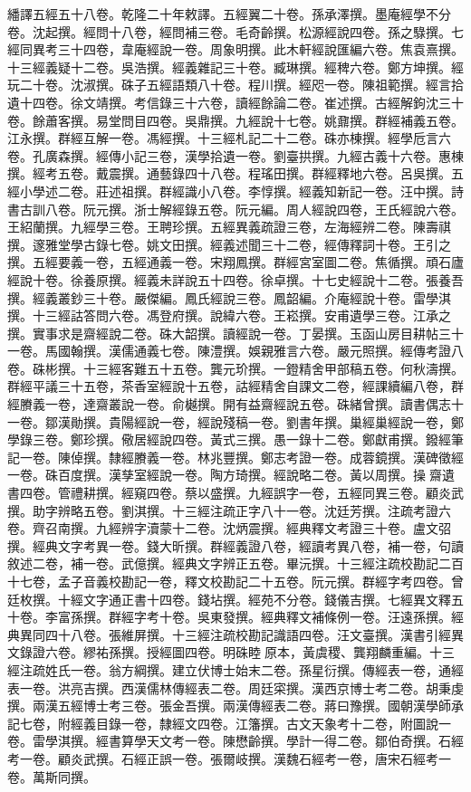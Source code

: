 \begin{pinyinscope}
繙譯五經五十八卷。乾隆二十年敕譯。五經翼二十卷。孫承澤撰。墨庵經學不分卷。沈起撰。經問十八卷，經問補三卷。毛奇齡撰。松源經說四卷。孫之騄撰。七經同異考三十四卷，韋庵經說一卷。周象明撰。此木軒經說匯編六卷。焦袁熹撰。十三經義疑十二卷。吳浩撰。經義雜記三十卷。臧琳撰。經稗六卷。鄭方坤撰。經玩二十卷。沈淑撰。硃子五經語類八十卷。程川撰。經咫一卷。陳祖範撰。經言拾遺十四卷。徐文靖撰。考信錄三十六卷，讀經餘論二卷。崔述撰。古經解鉤沈三十卷。餘蕭客撰。易堂問目四卷。吳鼎撰。九經說十七卷。姚鼐撰。群經補義五卷。江永撰。群經互解一卷。馮經撰。十三經札記二十二卷。硃亦棟撰。經學卮言六卷。孔廣森撰。經傳小記三卷，漢學拾遺一卷。劉臺拱撰。九經古義十六卷。惠棟撰。經考五卷。戴震撰。通藝錄四十八卷。程瑤田撰。群經釋地六卷。呂吳撰。五經小學述二卷。莊述祖撰。群經識小八卷。李惇撰。經義知新記一卷。汪中撰。詩書古訓八卷。阮元撰。浙士解經錄五卷。阮元編。周人經說四卷，王氏經說六卷。王紹蘭撰。九經學三卷。王聘珍撰。五經異義疏證三卷，左海經辨二卷。陳壽祺撰。邃雅堂學古錄七卷。姚文田撰。經義述聞三十二卷，經傳釋詞十卷。王引之撰。五經要義一卷，五經通義一卷。宋翔鳳撰。群經宮室圖二卷。焦循撰。頑石廬經說十卷。徐養原撰。經義未詳說五十四卷。徐卓撰。十七史經說十二卷。張養吾撰。經義叢鈔三十卷。嚴傑編。鳳氏經說三卷。鳳韶編。介庵經說十卷。雷學淇撰。十三經詁答問六卷。馮登府撰。說緯六卷。王崧撰。安甫遺學三卷。江承之撰。實事求是齋經說二卷。硃大韶撰。讀經說一卷。丁晏撰。玉函山房目耕帖三十一卷。馬國翰撰。漢儒通義七卷。陳澧撰。娛親雅言六卷。嚴元照撰。經傳考證八卷。硃彬撰。十三經客難五十五卷。龔元玠撰。一鐙精舍甲部稿五卷。何秋濤撰。群經平議三十五卷，茶香室經說十五卷，詁經精舍自課文二卷，經課續編八卷，群經賸義一卷，達齋叢說一卷。俞樾撰。開有益齋經說五卷。硃緒曾撰。讀書偶志十一卷。鄒漢勛撰。貴陽經說一卷，經說殘稿一卷。劉書年撰。巢經巢經說一卷，鄭學錄三卷。鄭珍撰。儆居經說四卷。黃式三撰。愚一錄十二卷。鄭獻甫撰。鏺經筆記一卷。陳倬撰。隸經賸義一卷。林兆豐撰。鄭志考證一卷。成蓉鏡撰。漢碑徵經一卷。硃百度撰。漢孳室經說一卷。陶方琦撰。經說略二卷。黃以周撰。操齋遺書四卷。管禮耕撰。經窺四卷。蔡以盛撰。九經誤字一卷，五經同異三卷。顧炎武撰。助字辨略五卷。劉淇撰。十三經注疏正字八十一卷。沈廷芳撰。注疏考證六卷。齊召南撰。九經辨字瀆蒙十二卷。沈炳震撰。經典釋文考證三十卷。盧文弨撰。經典文字考異一卷。錢大昕撰。群經義證八卷，經讀考異八卷，補一卷，句讀敘述二卷，補一卷。武億撰。經典文字辨正五卷。畢沅撰。十三經注疏校勘記二百十七卷，孟子音義校勘記一卷，釋文校勘記二十五卷。阮元撰。群經字考四卷。曾廷枚撰。十經文字通正書十四卷。錢坫撰。經苑不分卷。錢儀吉撰。七經異文釋五十卷。李富孫撰。群經字考十卷。吳東發撰。經典釋文補條例一卷。汪遠孫撰。經典異同四十八卷。張維屏撰。十三經注疏校勘記識語四卷。汪文臺撰。漢書引經異文錄證六卷。繆祐孫撰。授經圖四卷。明硃睦原本，黃虞稷、龔翔麟重編。十三經注疏姓氏一卷。翁方綱撰。建立伏博士始末二卷。孫星衍撰。傳經表一卷，通經表一卷。洪亮吉撰。西漢儒林傳經表二卷。周廷寀撰。漢西京博士考二卷。胡秉虔撰。兩漢五經博士考三卷。張金吾撰。兩漢傳經表二卷。蔣曰豫撰。國朝漢學師承記七卷，附經義目錄一卷，隸經文四卷。江籓撰。古文天象考十二卷，附圖說一卷。雷學淇撰。經書算學天文考一卷。陳懋齡撰。學計一得二卷。鄒伯奇撰。石經考一卷。顧炎武撰。石經正誤一卷。張爾岐撰。漢魏石經考一卷，唐宋石經考一卷。萬斯同撰。
\end{pinyinscope}
